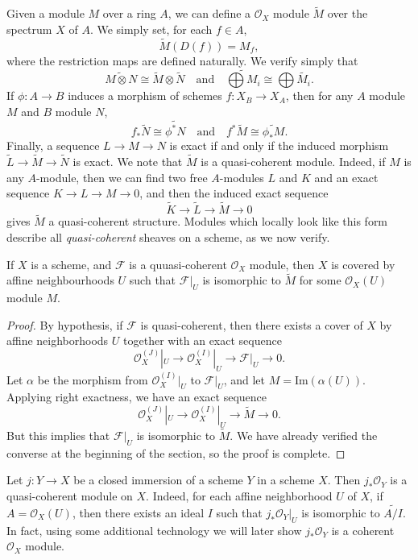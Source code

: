 Given a module $M$ over a ring $A$, we can define a $\mathcal{O}_X$ module $\widetilde{M}$ over the spectrum $X$ of $A$. We simply set, for each $f \in A$,
%
\[ \widetilde{M}(D(f)) = M_f, \]
%
where the restriction maps are defined naturally. We verify simply that
%
\[ \widetilde{M \otimes N} \cong \widetilde{M} \otimes \widetilde{N} \quad\text{and}\quad \widetilde{\bigoplus M_i} \cong \bigoplus \widetilde{M_i}. \]
%
If $\phi: A \to B$ induces a morphism of schemes $f: X_B \to X_A$, then for any $A$ module $M$ and $B$ module $N$,
%
\[ f_* \widetilde{N} \cong \widetilde{\phi^* N} \quad\text{and}\quad f^* \widetilde{M} \cong \widetilde{\phi_* M}. \]
%
Finally, a sequence $L \to M \to N$ is exact if and only if the induced morphism $\widetilde{L} \to \widetilde{M} \to \widetilde{N}$ is exact. We note that $\widetilde{M}$ is a quasi-coherent module. Indeed, if $M$ is any $A$-module, then we can find two free $A$-modules $L$ and $K$ and an exact sequence $K \to L \to M \to 0$, and then the induced exact sequence
%
\[ \widetilde{K} \to \widetilde{L} \to \widetilde{M} \to 0 \]
%
gives $\widetilde{M}$ a quasi-coherent structure. Modules which locally look like this form describe all \emph{quasi-coherent} sheaves on a scheme, as we now verify.

\begin{lemma}
    If $X$ is a scheme, and $\mathcal{F}$ is a quuasi-coherent $\mathcal{O}_X$ module, then $X$ is covered by affine neighbourhoods $U$ such that $\mathcal{F}|_U$ is isomorphic to $\tilde{M}$ for some $\mathcal{O}_X(U)$ module $M$.
\end{lemma}
\begin{proof}
    By hypothesis, if $\mathcal{F}$ is quasi-coherent, then there exists a cover of $X$ by affine neighborhoods $U$ together with an exact sequence
    \[ \mathcal{O}_X^{(J)}|_U \to \mathcal{O}_X^{(I)}|_U \to \mathcal{F}|_U \to 0. \]
    Let $\alpha$ be the morphism from $\mathcal{O}_X^{(I)}|_U$ to $\mathcal{F}|_U$, and let $M = \text{Im}(\alpha(U))$. Applying right exactness, we have an exact sequence
    \[ \mathcal{O}_X^{(J)}|_U \to \mathcal{O}_X^{(I)}|_U \to \widetilde{M} \to 0. \]
    But this implies that $\mathcal{F}|_U$ is isomorphic to $\widetilde{M}$. We have already verified the converse at the beginning of the section, so the proof is complete.
\end{proof}

\begin{example}
    Let $j: Y \to X$ be a closed immersion of a scheme $Y$ in a scheme $X$. Then $j_* \mathcal{O}_Y$ is a quasi-coherent module on $X$. Indeed, for each affine neighborhood $U$ of $X$, if $A = \mathcal{O}_X(U)$, then there exists an ideal $I$ such that $j_* \mathcal{O}_Y|_U$ is isomorphic to $\widetilde{A/I}$. In fact, using some additional technology we will later show $j_* \mathcal{O}_Y$ is a coherent $\mathcal{O}_X$ module.
\end{example}

